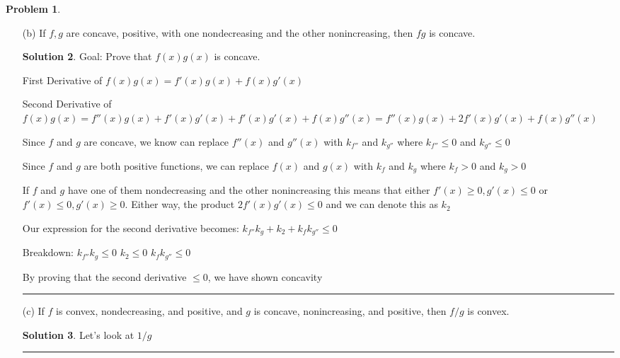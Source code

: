 \documentclass{article}
\theoremstyle{definition}
\newtheorem{problem}{Problem}
\def\fline{\rule{0.75\linewidth}{0.5pt}}
\newcommand{\finishline}{\begin{center}\fline\end{center}}
\newtheorem*{solution*}{Solution}
\newenvironment{solution}{\begin{solution*}}{{\finishline} \end{solution*}}
\begin{document}
\begin{problem}
\begin{itemize}
\begin{solution}
            By proving that the second derivative $\geq 0$, we have shown convexity

        \end{solution}
        \item[(b)] If $f, g$ are concave, positive, with one nondecreasing and the other nonincreasing, then $fg$ is concave.

        \begin{solution}
            Goal: Prove that $f(x) g(x)$ is concave. \newline 

            First Derivative of $f(x) g(x) = f'(x) g(x) + f(x) g'(x)$ \newline 

            Second Derivative of $f(x) g(x) = f''(x) g(x) + f'(x) g'(x) + f'(x) g'(x) + f(x) g''(x) = f''(x) g(x) + 2f'(x)g'(x) + f(x) g''(x)$

            Since $f$ and $g$ are concave, we know can replace $f''(x)$ and $g''(x)$ with $k_{f''}$ and $k_{g''}$ where $k_{f''} \leq 0$ and $k_{g''} \leq 0$

            Since $f$ and $g$ are both positive functions, we can replace $f(x)$ and $g(x)$ with $k_{f}$ and $k_{g}$ where $k_{f} > 0$ and $k_{g} > 0$

            If $f$ and $g$ have one of them nondecreasing and the other nonincreasing this means that either $f'(x) \geq 0, g'(x) \leq 0$ or $f'(x) \leq 0, g'(x) \geq 0$. Either way, the product $2f'(x)g'(x) \leq 0$ and we can denote this as $k_2$

            Our expression for the second derivative becomes: \newline 
            $k_{f''} k_{g} + k_2 + k_{f} k_{g''} \leq 0$ \newline

            Breakdown: \newline 
            $k_{f''} k_{g} \leq 0$ \newline 
            $k_2 \leq 0$ \newline 
            $k_{f} k_{g''} \leq 0$ \newline 

            By proving that the second derivative $\leq 0$, we have shown concavity
            

        \end{solution}
        \item[(c)] If $f$ is convex, nondecreasing, and positive, and $g$ is concave, nonincreasing, and positive, then $f /g$ is convex.
        \begin{solution}
            Let's look at $1/g$ \newline 


\end{solution}
\end{itemize}
\end{problem}
\end{document}
